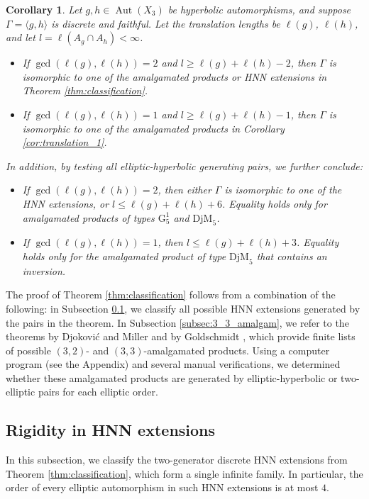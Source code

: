 \documentclass[12pt,leqno]{amsart}
\newcommand{\2}{L^2_{\rm per}(0, T)}
\newtheorem{cor}{Corollary}[section]
\newcommand{\aut}{{\operatorname{Aut}}}
\numberwithin{equation}{section}
\numberwithin{figure}{section}
\begin{document}
\begin{cor}
    Let $g,h\in\aut(X_3)$ be hyperbolic automorphisms, and suppose $\Gamma = \langle g,h\rangle$ is discrete and faithful. Let the translation lengths be $\ell(g)$, $\ell(h)$, and let $l = \ell(A_g\cap A_h)<\infty$.
    \begin{itemize}
        \item If $\gcd(\ell(g),\ell(h)) = 2$ and $l\geq \ell(g)+\ell(h) - 2$, then $\Gamma$ is isomorphic to one of the amalgamated products or HNN extensions in Theorem \ref{thm:classification}.
        \item If $\gcd(\ell(g),\ell(h)) = 1$ and $l\geq \ell(g)+\ell(h) - 1$, then $\Gamma$ is isomorphic to one of the amalgamated products in Corollary \ref{cor:translation_1}.
    \end{itemize}
    In addition, by testing all elliptic-hyperbolic generating pairs, we further conclude:
    \begin{itemize}
        \item If $\gcd(\ell(g),\ell(h)) = 2$, then either $\Gamma$ is isomorphic to one of the HNN extensions, or $l\leq \ell(g)+\ell(h) + 6$. Equality holds only for amalgamated products of types $\mathrm{G}_5^1$ and $\mathrm{DjM}_5$.
        \item If $\gcd(\ell(g),\ell(h)) = 1$, then $l\leq \ell(g)+\ell(h) + 3$. Equality holds only for the amalgamated product of type $\mathrm{DjM}_5$ that contains an inversion.
    \end{itemize}
\end{cor}
The proof of Theorem \ref{thm:classification} follows from a combination of the following: in Subsection \ref{subsec:HNN}, we classify all possible HNN extensions generated by the pairs in the theorem. In Subsection \ref{subsec:3_3_amalgam}, we refer to the theorems by Djokovi\'c and Miller \cite{djokovic1977regular} and by Goldschmidt \cite{goldschmidt1980automorphisms}, which provide finite lists of possible $(3,2)$- and $(3,3)$-amalgamated products. Using a computer program (see the Appendix) and several manual verifications, we determined whether these amalgamated products are generated by elliptic-hyperbolic or two-elliptic pairs for each elliptic order.
\subsection{Rigidity in HNN extensions}\label{subsec:HNN}
In this subsection, we classify the two-generator discrete HNN extensions from Theorem \ref{thm:classification}, which form a single infinite family. In particular, the order of every elliptic automorphism in such HNN extensions is at most $4$.
\end{document}
